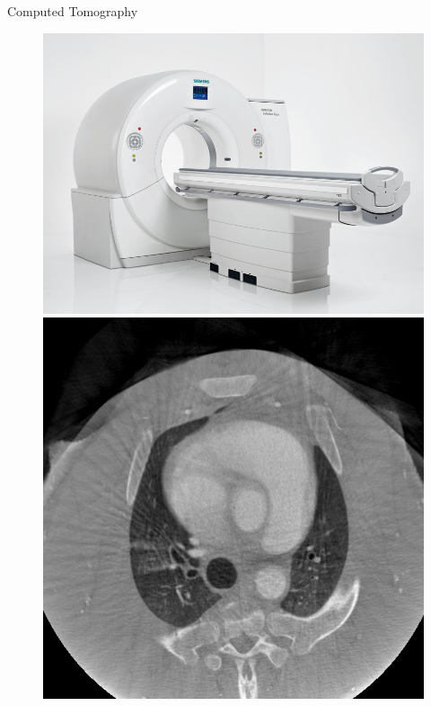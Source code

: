 

\begin{frame}[c]{Computed Tomography}
	\begin{figure}
		\includegraphics[height=.4\linewidth]{images/ct-somatom-definition-flash3.png}
		\hspace*{.25cm}
		\includegraphics[height=.4\linewidth]{images/m1000-1000HU.png}
	\end{figure}
\end{frame}

\subtitle{Motivation - Part 2}
\frame[plain,c]{\titlepage}

